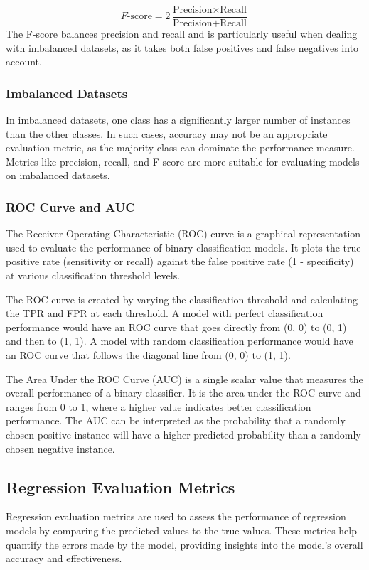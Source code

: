 \documentclass[12pt]{article}
\begin{document}
$$F\text{-score} = 2 \frac{\text{Precision} \times \text{Recall}}{\text{Precision} + \text{Recall}}$$
The F-score balances precision and recall and is particularly useful when dealing with imbalanced datasets, as it takes both false positives and false negatives into account.

\subsubsection{Imbalanced Datasets}
In imbalanced datasets, one class has a significantly larger number of instances than the other classes. In such cases, accuracy may not be an appropriate evaluation metric, as the majority class can dominate the performance measure. Metrics like precision, recall, and F-score are more suitable for evaluating models on imbalanced datasets.

\subsubsection{ROC Curve and AUC}
The Receiver Operating Characteristic (ROC) curve is a graphical representation used to evaluate the performance of binary classification models. It plots the true positive rate (sensitivity or recall) against the false positive rate (1 - specificity) at various classification threshold levels.

The ROC curve is created by varying the classification threshold and calculating the TPR and FPR at each threshold. A model with perfect classification performance would have an ROC curve that goes directly from (0, 0) to (0, 1) and then to (1, 1). A model with random classification performance would have an ROC curve that follows the diagonal line from (0, 0) to (1, 1).

The Area Under the ROC Curve (AUC) is a single scalar value that measures the overall performance of a binary classifier. It is the area under the ROC curve and ranges from 0 to 1, where a higher value indicates better classification performance. The AUC can be interpreted as the probability that a randomly chosen positive instance will have a higher predicted probability than a randomly chosen negative instance.


\subsection{Regression Evaluation Metrics}

Regression evaluation metrics are used to assess the performance of regression models by comparing the predicted values to the true values. These metrics help quantify the errors made by the model, providing insights into the model's overall accuracy and effectiveness.
\end{document}
